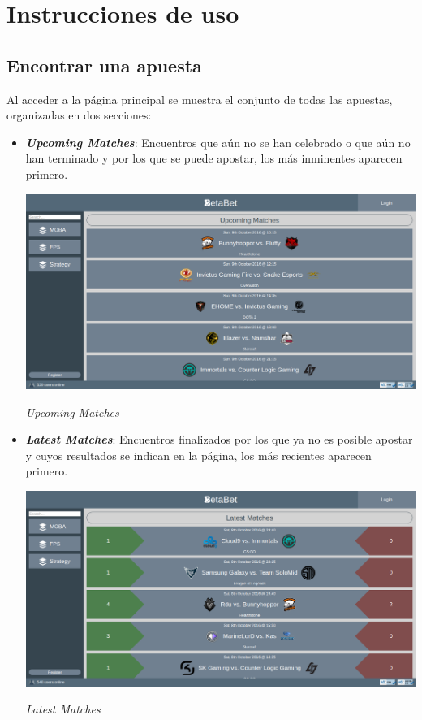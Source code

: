 \documentclass{article}
\begin{document}
\section{Instrucciones de uso}
\subsection{Encontrar una apuesta}
Al acceder a la página principal se muestra el conjunto de todas las apuestas, organizadas en dos secciones:
\begin{itemize}
    \item\textbf{\textit{Upcoming Matches}}: Encuentros que aún no se han celebrado o que aún no han terminado y por los que se puede apostar, los más inminentes aparecen primero.
        \smallbreak
        \begin{minipage}{\linewidth}
            \centering
            \captionsetup{type=figure}
            \includegraphics[width=\linewidth]{fig1}
            \caption{\textit{Upcoming Matches}}
            \label{fig:fig1}
        \end{minipage}
    \item\textbf{\textit{Latest Matches}}: Encuentros finalizados por los que ya no es posible apostar y cuyos resultados se indican en la página, los más recientes aparecen primero.\
        \smallbreak
        \begin{minipage}{\linewidth}
            \centering
            \captionsetup{type=figure}
            \includegraphics[width=\linewidth]{fig2}
            \caption{\textit{Latest Matches}}
            \label{fig:fig2}
        \end{minipage}
\end{itemize}
\end{document}
